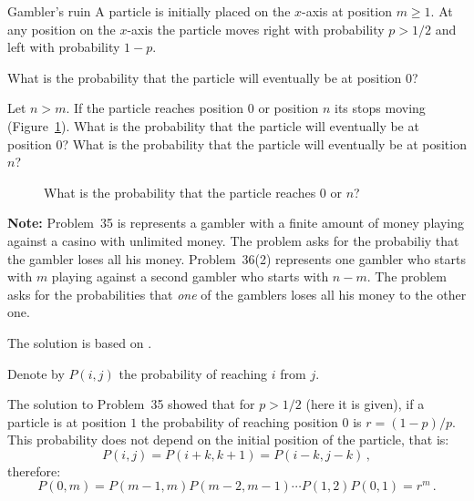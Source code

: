 \begin{prob}{Gambler's ruin}
A particle is initially placed on the $x$-axis at position $m\geq 1$. At any position on the $x$-axis the particle moves right with probability $p>1/2$ and left with probability $1-p$.

 What is the probability that the particle will eventually be at position $0$?

 Let $n>m$. If the particle reaches position $0$ or position $n$ its stops moving (Figure~\ref{f.ruin3}). What is the probability that the particle will eventually be at position $0$? What is the probability that the particle will eventually be at position $n$?
\begin{figure}[tb]
\begin{center}
\end{center}
\caption{What is the probability that the particle reaches $0$ or $n$?}\label{f.ruin3}
\end{figure}

\textbf{Note:} Problem~35 is represents a gambler with a finite amount of money playing against a casino with unlimited money. The problem asks for the probabiliy that the gambler loses all his money. Problem~36(2) represents one gambler who starts with $m$ playing against a second gambler who starts with $n-m$. The problem asks for the probabilities that \emph{one} of the gamblers loses all his money to the other one.
\end{prob}

\solution{}

The solution is based on \cite[Chapter~3, Example~4m]{ross}.

Denote by $P(i,j)$ the probability of reaching $i$ from $j$.

 The solution to Problem~35 showed that for $p>1/2$ (here it is given), if a particle is at position $1$ the probability of reaching position $0$ is $r=(1-p)/p$. This probability does not depend on the initial position of the particle, that is:
\[
P(i,j) = P(i+k,k+1) = P(i-k,j-k)\,,
\]
therefore:
\begin{equation}
P(0,m)=P(m-1,m)P(m-2,m-1)\cdots P(1,2)P(0,1)=r^m\,.
\end{equation}

